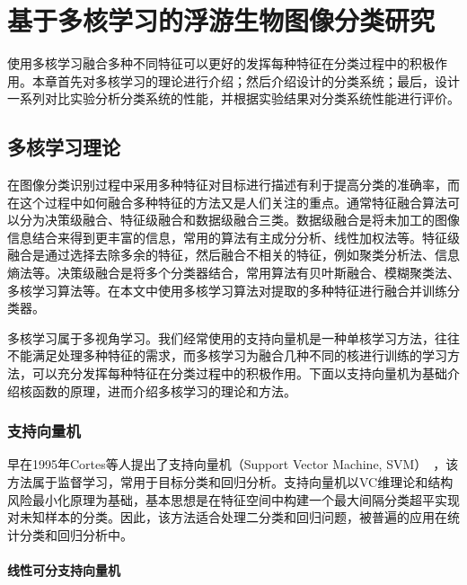 \chapter{基于多核学习的浮游生物图像分类研究}

使用多核学习融合多种不同特征可以更好的发挥每种特征在分类过程中的积极作用。本章首先对多核学习的理论进行介绍；然后介绍设计的分类系统；最后，设计一系列对比实验分析分类系统的性能，并根据实验结果对分类系统性能进行评价。

\section{多核学习理论}

在图像分类识别过程中采用多种特征对目标进行描述有利于提高分类的准确率，而在这个过程中如何融合多种特征的方法又是人们关注的重点。通常特征融合算法可以分为决策级融合、特征级融合和数据级融合三类。数据级融合是将未加工的图像信息结合来得到更丰富的信息，常用的算法有主成分分析、线性加权法等。特征级融合是通过选择去除多余的特征，然后融合不相关的特征，例如聚类分析法、信息熵法等。决策级融合是将多个分类器结合，常用算法有贝叶斯融合、模糊聚类法、多核学习算法等。在本文中使用多核学习算法对提取的多种特征进行融合并训练分类器。

多核学习属于多视角学习。我们经常使用的支持向量机是一种单核学习方法，往往不能满足处理多种特征的需求，而多核学习为融合几种不同的核进行训练的学习方法，可以充分发挥每种特征在分类过程中的积极作用。下面以支持向量机为基础介绍核函数的原理，进而介绍多核学习的理论和方法。

\subsection{支持向量机}

早在1995年Cortes等人提出了支持向量机（Support Vector Machine, SVM）~\cite{Cortes1995Support}，该方法属于监督学习，常用于目标分类和回归分析。支持向量机以VC维理论和结构风险最小化原理为基础，基本思想是在特征空间中构建一个最大间隔分类超平实现对未知样本的分类。因此，该方法适合处理二分类和回归问题，被普遍的应用在统计分类和回归分析中。

\subsubsection{线性可分支持向量机}

